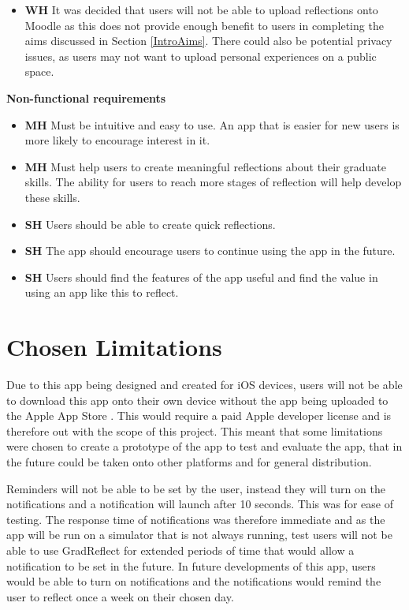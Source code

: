 \documentclass{l4proj}
\begin{document}
\begin{itemize}
    \item \textbf{WH} It was decided that users will not be able to upload reflections onto Moodle as this does not provide enough benefit to users in completing the aims discussed in Section \ref{IntroAims}. There could also be potential privacy issues, as users may not want to upload personal experiences on a public space.
\end{itemize}


\textbf{Non-functional requirements}
\begin{itemize}
    \item \textbf{MH} Must be intuitive and easy to use. An app that is easier for new users is more likely to encourage interest in it.
    \item \textbf{MH} Must help users to create meaningful reflections about their graduate skills. The ability for users to reach more stages of reflection will help develop these skills.
    \item \textbf{SH} Users should be able to create quick reflections.
    \item \textbf{SH} The app should encourage users to continue using the app in the future.
    \item \textbf{SH} Users should find the features of the app useful and find the value in using an app like this to reflect. 
\end{itemize}


\section{Chosen Limitations}

Due to this app being designed and created for iOS devices, users will not be able to download this app onto their own device without the app being uploaded to the Apple App Store \citep{apple_inc_app_2021}. This would require a paid Apple developer license and is therefore out with the scope of this project. This meant that some limitations were chosen to create a prototype of the app to test and evaluate the app, that in the future could be taken onto other platforms and for general distribution.

Reminders will not be able to be set by the user, instead they will turn on the notifications and a notification will launch after 10 seconds. This was for ease of testing. The response time of notifications was therefore immediate and as the app will be run on a simulator that is not always running, test users will not be able to use GradReflect for extended periods of time that would allow a notification to be set in the future. In future developments of this app, users would be able to turn on notifications and the notifications would remind the user to reflect once a week on their chosen day.
\end{document}
